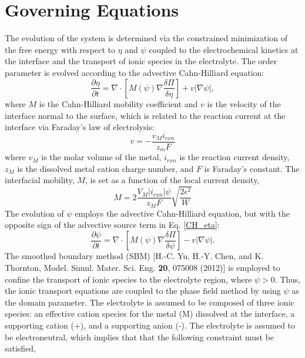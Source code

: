 \documentclass[11pt]{article}
\renewcommand{\=}[1]{\stackrel{#1}{=}} %
\theoremstyle{definition}
\theoremstyle{remark}
\begin{document}
\section{Governing Equations}
The evolution of the system is determined via the constrained minimization of the free energy with respect to $\eta$  and  $\psi$ coupled to the electrochemical kinetics at the interface and the transport of ionic species in the electrolyte. The order parameter is evolved according to the advective Cahn-Hilliard equation:
\begin{equation}
\label{CH_eta}
 \frac{\partial \eta}{\partial t} = \nabla \cdot \left[ M(\psi) \nabla \frac{\delta \Pi}{\delta \eta}\right] + v |\nabla \psi|,
 \end{equation}
\noindent where $M$ is the Cahn-Hilliard mobility coefficient and $v$ is the velocity of the interface normal to the surface, which is related to the reaction current at the interface via Faraday's law of electrolysis:
\begin{equation}
\label{int_vel}
v=-\frac{v_M i_{rxn}}{z_m F}
 \end{equation}
\noindent where $v_M$ is the molar volume of the metal, $i_{rxn}$ is the reaction current density, $z_M$ is the dissolved metal cation charge number, and $F$ is Faraday's constant. The interfacial mobility, $M$, is set as a function of the local current density,
\begin{equation}
M=2\frac{V_M |i_{rxn}| \psi}{z_M F}\sqrt{\frac{2 \epsilon^2}{W}}
\end{equation}
The evolution of $\psi$ employs the advective Cahn-Hilliard equation, but with the opposite sign of the advective source term in Eq. \eqref{CH_eta}:
\begin{equation}
\label{CH_psi}
 \frac{\partial \psi}{\partial t} = \nabla \cdot \left[ M(\psi) \nabla \frac{\delta \Pi}{\delta \psi} \right] - v |\nabla \psi|.
 \end{equation}
 The smoothed boundary method (SBM)  [H.-C. Yu, H.-Y. Chen, and K. Thornton, Model. Simul. Mater. Sci. Eng. {\bf 20}, 075008
(2012)] is employed to confine the transport of ionic species to the electrolyte region, where $\psi > 0$. Thus, the ionic transport equations are coupled to the phase field method by using  $\psi$ as the domain parameter. The electrolyte is assumed to be composed of three ionic species: an effective cation species for the metal (M) dissolved at the interface, a supporting cation (+), and a supporting anion (-). The electrolyte is assumed to be electroneutral, which implies that that the following constraint must be satisfied,
\end{document}
